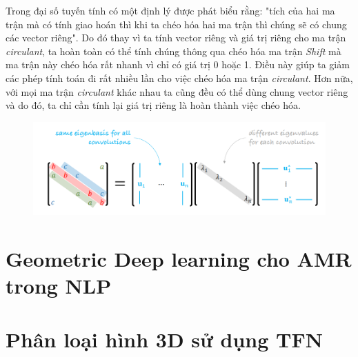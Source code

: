 Trong đại số tuyến tính có một định lý được phát biểu rằng: "tích của hai ma trận mà có tính giao hoán thì khi ta chéo hóa hai ma trận thì chúng sẽ có chung các vector riêng". Do đó thay vì ta tính vector riêng và giá trị riêng cho ma trận \textit{circulant}, ta hoàn toàn có thể tính chúng thông qua chéo hóa ma trận \textit{Shift} mà ma trận này chéo hóa rất nhanh vì chỉ có giá trị 0 hoặc 1. Điều này giúp ta giảm các phép tính toán đi rất nhiều lần cho việc chéo hóa ma trận \textit{circulant}. Hơn nữa, với mọi ma trận \textit{circulant} khác nhau ta cũng đều có thể dùng chung vector riêng và do đó, ta chỉ cần tính lại giá trị riêng là hoàn thành việc chéo hóa.

\begin{figure}[H]
    \centering
    \includegraphics[width=1\linewidth]{Images/GDL/grid_conv/convolution_diagon.png}
\end{figure}





\section{Geometric Deep learning cho AMR trong NLP}


\section{Phân loại hình 3D sử dụng TFN}
